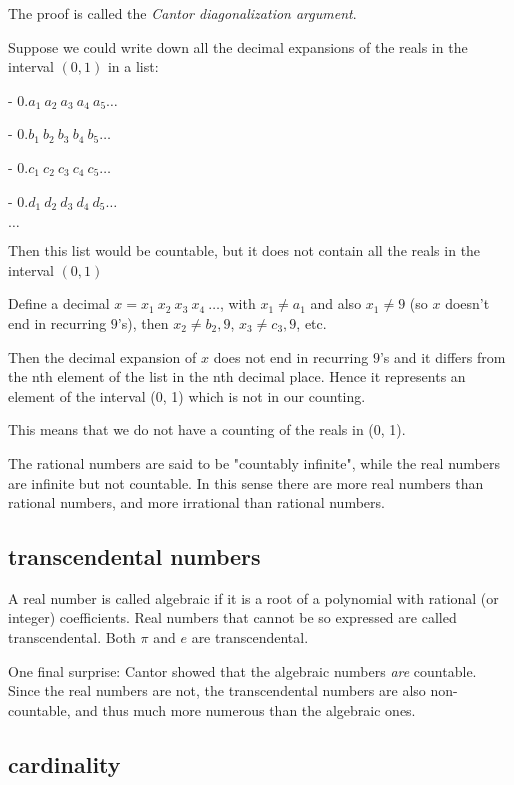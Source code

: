 \documentclass[11pt, oneside]{article}
\begin{document}
The proof is called the \emph{Cantor diagonalization argument}.

Suppose we could write down all the decimal expansions of the reals in the interval $(0,1)$ in a list:

- $0. a_1 \ a_2 \ a_3 \ a_4 \ a_5 \dots$

- $0. b_1 \ b_2 \ b_3 \ b_4 \ b_5 \dots$

- $0. c_1 \ c_2 \ c_3 \ c_4 \ c_5 \dots$

- $0. d_1 \ d_2 \ d_3 \ d_4 \ d_5 \dots$

$\dots$

Then this list would be countable, but it does not contain all the reals in the interval $(0,1)$

Define a decimal $x = x_1 \ x_2 \ x_3 \ x_4 \ \dots$, with $x_1 \ne a_1$ and also $x_1 \ne 9$ (so $x$ doesn't end in recurring $9$'s), then $x_2 \ne b_2,9$, $x_3 \ne c_3,9$, etc.

Then the decimal expansion of $x$ does not end in recurring $9$'s and it differs from the nth element of the list in the nth decimal place. Hence it represents an element of the interval (0, 1) which is not in our counting.

This means that we do not have a counting of the reals in (0, 1).

The rational numbers are said to be "countably infinite", while the real numbers are infinite but not countable.  In this sense there are more real numbers than rational numbers, and more irrational than rational numbers.

\subsection*{transcendental numbers}

A real number is called algebraic if it is a root of a polynomial with rational (or integer) coefficients. Real numbers that cannot be so expressed are called transcendental.  Both $\pi$ and $e$ are transcendental.

One final surprise:  Cantor showed that the algebraic numbers \emph{are} countable. Since the real numbers are not, the transcendental numbers are also non-countable, and thus much more numerous than the algebraic ones.

\subsection*{cardinality}
\end{document}
